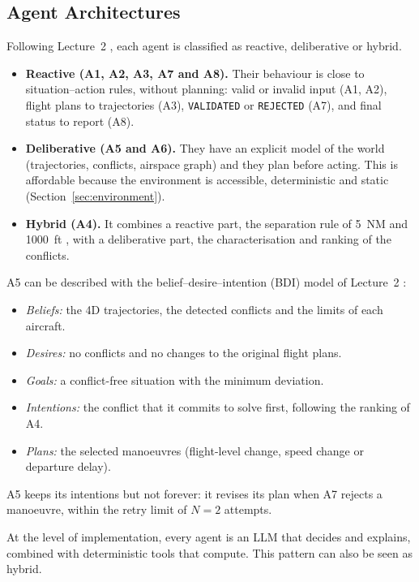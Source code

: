 \subsection{Agent Architectures}\label{sec:architectures}

Following Lecture~2 \cite{urvlect2}, each agent is classified as reactive, deliberative or hybrid.

\begin{itemize}[leftmargin=*]
    \item \textbf{Reactive (A1, A2, A3, A7 and A8).} Their behaviour is close to situation--action rules, without planning: valid or invalid input (A1, A2), flight plans to trajectories (A3), \texttt{VALIDATED} or \texttt{REJECTED} (A7), and final status to report (A8).
    \item \textbf{Deliberative (A5 and A6).} They have an explicit model of the world (trajectories, conflicts, airspace graph) and they plan before acting. This is affordable because the environment is accessible, deterministic and static (Section~\ref{sec:environment}).
    \item \textbf{Hybrid (A4).} It combines a reactive part, the separation rule of 5~NM and 1000~ft \cite{icao4444}, with a deliberative part, the characterisation and ranking of the conflicts.
\end{itemize}

A5 can be described with the belief--desire--intention (BDI) model of Lecture~2 \cite{urvlect2,bratman1987,rao1995}:
\begin{itemize}[leftmargin=*]
    \item \textit{Beliefs:} the 4D trajectories, the detected conflicts and the limits of each aircraft.
    \item \textit{Desires:} no conflicts and no changes to the original flight plans.
    \item \textit{Goals:} a conflict-free situation with the minimum deviation.
    \item \textit{Intentions:} the conflict that it commits to solve first, following the ranking of A4.
    \item \textit{Plans:} the selected manoeuvres (flight-level change, speed change or departure delay).
\end{itemize}
A5 keeps its intentions but not forever: it revises its plan when A7 rejects a manoeuvre, within the retry limit of $N = 2$ attempts.

At the level of implementation, every agent is an LLM that decides and explains, combined with deterministic tools that compute. This pattern can also be seen as hybrid.

